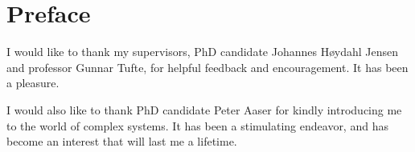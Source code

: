 \chapter*{Preface}

I would like to thank my supervisors, PhD candidate Johannes Høydahl Jensen and
professor Gunnar Tufte, for helpful feedback and encouragement. It has been a
pleasure.

I would also like to thank PhD candidate Peter Aaser for kindly introducing me
to the world of complex systems. It has been a stimulating endeavor, and has
become an interest that will last me a lifetime.

